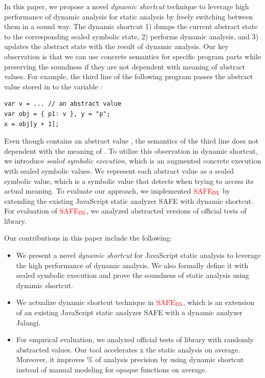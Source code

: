 In this paper, we propose a novel \textit{dynamic shortcut} technique to
leverage high performance of dynamic analysis for static analysis by freely
switching between them in a sound way.  The dynamic shortcut 1) dumps the
current abstract state to the corresponding sealed symbolic state, 2) performs
dynamic analysis, and 3) updates the abstract state with the result of dynamic
analysis.  Our key observation is that we can use concrete semantics for
specific program parts while preserving the soundness if they are not dependent
with meaning of abstract values.  For example, the third line of the following
program passes the abstract value  stored in  to the
variable :
\begin{lstlisting}[style=myJSstyle,numbers=none]
var v = ... // an abstract value
var obj = { p1: v }, y = "p";
x = obj[y + 1];
\end{lstlisting}
Even though  contains an abstract value , the semantics of
the third line does not dependent with the meaning of .  To utilize
this observation in dynamic shortcut, we introduce \textit{sealed symbolic
execution}, which is an augmented concrete execution with sealed symbolic
values.  We represent each abstract value as a sealed symbolic value, which is a
symbolic value that detects when trying to access its actual meaning.  To
evaluate our approach, we implemented ${\color{red}{\text{SAFE}_{\textsf{DS}}}}$ by extending the existing
JavaScript static analyzer SAFE with dynamic shortcut.  For evaluation of
${\color{red}{\text{SAFE}_{\textsf{DS}}}}$, we analyzed abstracted versions of  official tests of
 library.

Our contributions in this paper include the following:
\begin{itemize}
  \item We present a novel \textit{dynamic shortcut} for JavaScript static
    analysis to leverage the high performance of dynamic analysis.  We also
    formally define it with sealed symbolic execution and prove the soundness of
    static analysis using dynamic shortcut.
  \item We actualize dynamic shortcut technique in ${\color{red}{\text{SAFE}_{\textsf{DS}}}}$, which is an
    extension of an existing JavaScript static analyzer SAFE with a dynamic
    analyzer Jalangi.
  \item For empirical evaluation, we analyzed  official tests of
     library with randomly abstracted values.  Our tool
    accelerates x the static analysis on average.  Moreover, it
    improves \% of analysis precision by using dynamic shortcut
    instead of manual modeling for  opaque functions on average.
\end{itemize}

